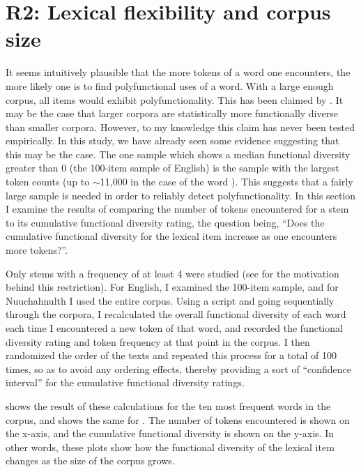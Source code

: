 \section{R2: Lexical flexibility and corpus size}
\label{sec:4.4}

It seems intuitively plausible that the more tokens of a word one encounters, the more likely one is to find polyfunctional uses of a word. With a large enough corpus, all items would exhibit polyfunctionality. This has been claimed by \textcite[77]{MoselHovdhaugen1992}. It may be the case that larger corpora are statistically more functionally diverse than smaller corpora. However, to my knowledge this claim has never been tested empirically. In this study, we have already seen some evidence suggesting that this may be the case. The one sample which shows a median functional diversity greater than $0$ (the 100-item sample of English) is the sample with the largest token counts (up to $\sim$11,000 in the case of the word ). This suggests that a fairly large sample is needed in order to reliably detect polyfunctionality. In this section I examine the results of comparing the number of tokens encountered for a stem to its cumulative functional diversity rating, the question being, \enquote{Does the cumulative functional diversity for the lexical item increase as one encounters more tokens?}.

Only stems with a frequency of at least 4 were studied (see  for the motivation behind this restriction). For English, I examined the 100-item sample, and for Nuuchahnulth I used the entire corpus. Using a script and going sequentially through the corpora, I recalculated the overall functional diversity of each word each time I encountered a new token of that word, and recorded the functional diversity rating and token frequency at that point in the corpus. I then randomized the order of the texts and repeated this process for a total of 100 times, so as to avoid any ordering effects, thereby providing a sort of \enquote{confidence interval} for the cumulative functional diversity ratings.

 shows the result of these calculations for the ten most frequent words in the  corpus, and  shows the same for . The number of tokens encountered is shown on the x-axis, and the cumulative functional diversity is shown on the y-axis. In other words, these plots show how the functional diversity of the lexical item changes as the size of the corpus grows.

